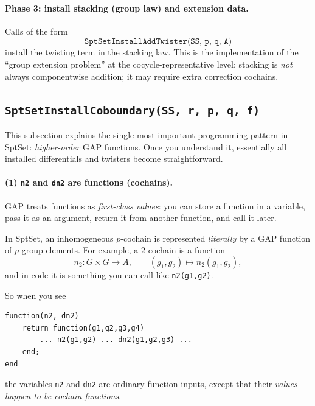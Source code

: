 \documentclass{SciPost}
\begin{document}
\paragraph{Phase 3: install stacking (group law) and extension data.}
Calls of the form
\begin{equation}
	\texttt{SptSetInstallAddTwister(SS, p, q, A)}
\end{equation}
install the twisting term in the stacking law.
This is the implementation of the ``group extension problem'' at the cocycle-representative level: stacking is \emph{not} always componentwise addition; it may require extra correction cochains.

\subsection{\texttt{SptSetInstallCoboundary(SS, r, p, q, f)}}
\label{subsec:callback-interface}

This subsection explains the single most important programming pattern in SptSet: \emph{higher-order} GAP functions.
Once you understand it, essentially all installed differentials and twisters become straightforward.

\paragraph{(1) \texttt{n2} and \texttt{dn2} are functions (cochains).}
GAP treats functions as \emph{first-class values}: you can store a function in a variable, pass it as an argument, return it from another function, and call it later.

In SptSet, an inhomogeneous $p$-cochain is represented \emph{literally} by a GAP function of $p$ group elements. For example, a $2$-cochain is a function
\begin{equation}
n_2: G\times G\to A,\qquad (g_1,g_2)\mapsto n_2(g_1,g_2),
\end{equation}
and in code it is something you can call like \texttt{n2(g1,g2)}.

So when you see
\begin{verbatim}
function(n2, dn2)
    return function(g1,g2,g3,g4)
        ... n2(g1,g2) ... dn2(g1,g2,g3) ...
    end;
end
\end{verbatim}
the variables \texttt{n2} and \texttt{dn2} are ordinary function inputs, except that their \emph{values happen to be cochain-functions}.
\end{document}
